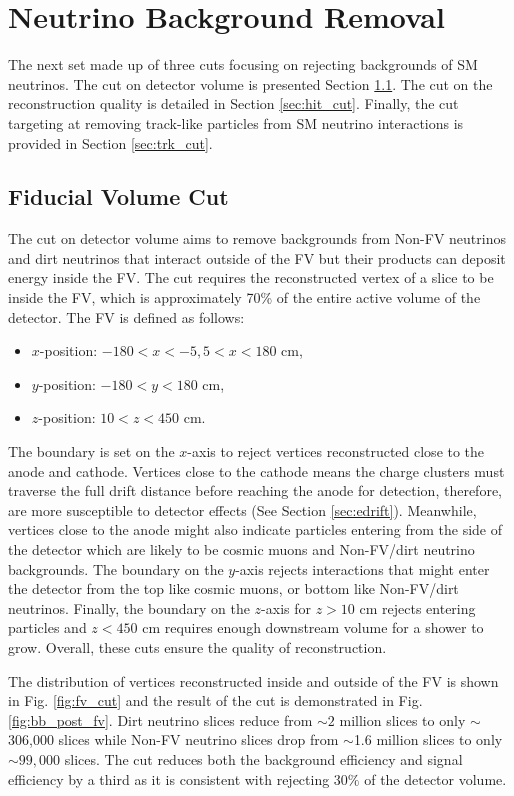 \section{Neutrino Background Removal}
\label{sec:sm_rej}

The next set made up of three cuts focusing on rejecting backgrounds of SM neutrinos.
The cut on detector volume is presented Section \ref{sec:fv_cut}.
The cut on the reconstruction quality is detailed in Section \ref{sec:hit_cut}.
Finally, the cut targeting at removing track-like particles from SM neutrino interactions is provided in Section \ref{sec:trk_cut}.

\subsection{Fiducial Volume Cut}
\label{sec:fv_cut}

The cut on detector volume aims to remove backgrounds from Non-FV neutrinos and dirt neutrinos that interact outside of the FV but their products can deposit energy inside the FV. 
The cut requires the reconstructed vertex of a slice to be inside the FV, which is approximately 70\% of the entire active volume of the detector. 
The FV is defined as follows:
\begin{itemize}
        \item $x$-position: $- 180 < x < -5 , 5 < x < 180$ cm,
        \item $y$-position: $-180 < y < 180$ cm,
        \item $z$-position: $10 < z < 450$ cm.
\end{itemize}
The boundary is set on the $x$-axis to reject vertices reconstructed close to the anode and cathode.
Vertices close to the cathode means the charge clusters must traverse the full drift distance before reaching the anode for detection, therefore, are more susceptible to detector effects (See Section \ref{sec:edrift}).
Meanwhile, vertices close to the anode might also indicate particles entering from the side of the detector which are likely to be cosmic muons and Non-FV/dirt neutrino backgrounds. 
The boundary on the $y$-axis rejects interactions that might enter the detector from the top like cosmic muons, or bottom like Non-FV/dirt neutrinos.
Finally, the boundary on the $z$-axis for $z > 10$ cm rejects entering particles and $z < 450$ cm requires enough downstream volume for a shower to grow.
Overall, these cuts ensure the quality of reconstruction.

The distribution of vertices reconstructed inside and outside of the FV is shown in Fig. \ref{fig:fv_cut} and the result of the cut is demonstrated in Fig. \ref{fig:bb_post_fv}.
Dirt neutrino slices reduce from $\sim2$ million slices to only $\sim$306,000 slices while Non-FV neutrino slices drop from $\sim$1.6 million slices to only $\sim99,000$ slices.
The cut reduces both the background efficiency and signal efficiency by a third as it is consistent with rejecting $30\%$ of the detector volume.

